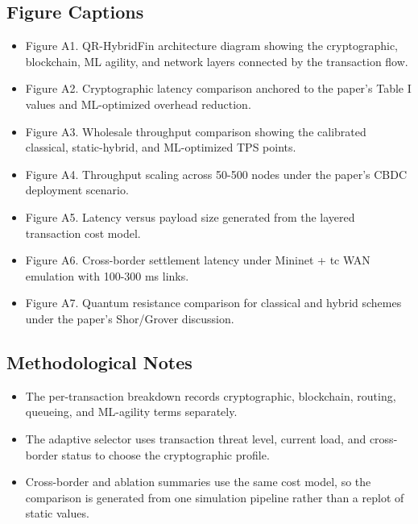 \subsection*{Figure Captions}
\begin{itemize}
\item Figure A1. QR-HybridFin architecture diagram showing the cryptographic, blockchain, ML agility, and network layers connected by the transaction flow.
\item Figure A2. Cryptographic latency comparison anchored to the paper's Table I values and ML-optimized overhead reduction.
\item Figure A3. Wholesale throughput comparison showing the calibrated classical, static-hybrid, and ML-optimized TPS points.
\item Figure A4. Throughput scaling across 50-500 nodes under the paper's CBDC deployment scenario.
\item Figure A5. Latency versus payload size generated from the layered transaction cost model.
\item Figure A6. Cross-border settlement latency under Mininet + tc WAN emulation with 100-300 ms links.
\item Figure A7. Quantum resistance comparison for classical and hybrid schemes under the paper's Shor/Grover discussion.
\end{itemize}
\subsection*{Methodological Notes}
\begin{itemize}
\item The per-transaction breakdown records cryptographic, blockchain, routing, queueing, and ML-agility terms separately.
\item The adaptive selector uses transaction threat level, current load, and cross-border status to choose the cryptographic profile.
\item Cross-border and ablation summaries use the same cost model, so the comparison is generated from one simulation pipeline rather than a replot of static values.
\end{itemize}
